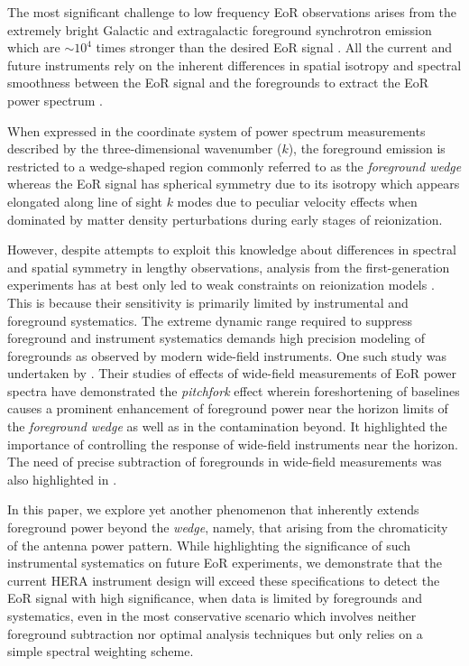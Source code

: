 \documentclass[preprint2,iop,numberedappendix,twocolappendix,appendixfloats]{emulateapj}
\begin{document}
The most significant challenge to low frequency EoR observations arises from the extremely bright Galactic and extragalactic foreground synchrotron emission which are $\sim 10^4$ times stronger than the desired EoR signal \citep{dim02,ali08,ber09,ber10,gho12}. All the current and future instruments rely on the inherent differences in spatial isotropy and spectral smoothness between the EoR signal and the foregrounds to extract the EoR power spectrum \citep[see, e.g.,][]{fur04b,mor04,zal04,san05,fur06,mcq06,mor06,wan06,gle08}. 

When expressed in the coordinate system of power spectrum measurements described by the three-dimensional wavenumber ($k$), the foreground emission is restricted to a wedge-shaped region commonly referred to as the {\it foreground wedge} \citep{bow09,liu09,liu14a,liu14b,dat10,liu11,gho12,mor12,par12b,tro12,ved12,dil13,pob13,thy13,dil14} whereas the EoR signal has spherical symmetry due to its isotropy which appears elongated along line of sight $k$ modes due to peculiar velocity effects when dominated by matter density perturbations during early stages of reionization. 

However, despite attempts to exploit this knowledge about differences in spectral and spatial symmetry in lengthy observations, analysis from the first-generation experiments has at best only led to weak constraints on reionization models \citep{ali15,dil15,pob15}. This is because their sensitivity is primarily limited by instrumental and foreground systematics. The extreme dynamic range required to suppress foreground and instrument systematics demands high precision modeling of foregrounds as observed by modern wide-field instruments. One such study was undertaken by \citet{thy15a,thy15b}. Their studies of effects of wide-field measurements of EoR power spectra have demonstrated the {\it pitchfork} effect wherein foreshortening of baselines causes a prominent enhancement of foreground power near the horizon limits of the {\it foreground wedge} as well as in the contamination beyond. It highlighted the importance of controlling the response of wide-field instruments near the horizon. The need of precise subtraction of foregrounds in wide-field measurements was also highlighted in \citet{pob16}.

In this paper, we explore yet another phenomenon that inherently extends foreground power beyond the {\it wedge}, namely, that arising from the chromaticity of the antenna power pattern. While highlighting the significance of such instrumental systematics on future EoR experiments, we demonstrate that the current HERA instrument design will exceed these specifications to detect the EoR signal with high significance, when data is limited by foregrounds and systematics, even in the most conservative scenario which involves neither foreground subtraction nor optimal analysis techniques but only relies on a simple spectral weighting scheme. 
\end{document}
